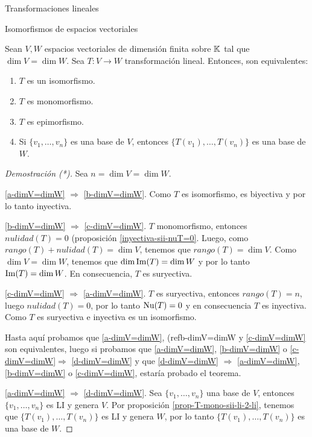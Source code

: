\begin{chapter}{Transformaciones lineales}
\begin{section}{Isomorfismos de espacios vectoriales}
        
   
            
            
        \begin{teorema}
            Sean $V,W$ espacios vectoriales de dimensión  finita sobre $\mathbb K$ tal que $\dim V = \dim W$. Sea $T: V \to W$ transformación lineal. Entonces,  son equivalentes:
            \begin{enumerate}[label=\textit{\alph*)},ref=\textit{\alph*)}]
                \item\label{a-dimV=dimW} $T$ es un  isomorfismo.
                \item\label{b-dimV=dimW} $T$ es monomorfismo.
                \item\label{c-dimV=dimW} $T$ es epimorfismo.
                \item\label{d-dimV=dimW} Si $\{v_1,\ldots,v_n \}$ es una base de $V$,  entonces $\{T(v_1),\ldots,T(v_n) \}$ es una base de $W$.
            \end{enumerate}
        \end{teorema}
        \begin{proof}[Demostración (*)] Sea $n = \dim V = \dim W$.
            
            
            \ref{a-dimV=dimW} $\Rightarrow$ \ref{b-dimV=dimW}. Como $T$ es isomorfismo,  es biyectiva y por lo tanto inyectiva.
            
            \ref{b-dimV=dimW} $\Rightarrow$ 
            \ref{c-dimV=dimW}. $T$ monomorfismo,  entonces $nulidad(T) = 0$ (proposición \ref{inyectiva-sii-nuT=0}. Luego, como  $rango(T) +nulidad(T) = \dim V$,  tenemos que $rango(T) = \dim V$. Como $\dim V = \dim W$, tenemos que $\dim \operatorname{Im}(T) = \dim W$ y por lo tanto $\operatorname{Im}(T) = \dim W$. En  consecuencia, $T$ es suryectiva.
            
            \ref{c-dimV=dimW} $\Rightarrow$ \ref{a-dimV=dimW}. $T$ es suryectiva, entonces $rango(T) = n$, luego  $nulidad(T) = 0$, por lo tanto $\operatorname{Nu}(T)=0$ y en consecuencia $T$ es inyectiva. Como $T$ es suryectiva e inyectiva  es un isomorfismo. 
            
            Hasta aquí probamos que \ref{a-dimV=dimW}, (ref{b-dimV=dimW} y \ref{c-dimV=dimW} son equivalentes, luego si probamos que \ref{a-dimV=dimW}, \ref{b-dimV=dimW} o \ref{c-dimV=dimW}$\Rightarrow$ \ref{d-dimV=dimW} y que \ref{d-dimV=dimW} $\Rightarrow$ \ref{a-dimV=dimW}, \ref{b-dimV=dimW} o \ref{c-dimV=dimW}, estaría probado el teorema. 
            
            \ref{a-dimV=dimW} $\Rightarrow$ \ref{d-dimV=dimW}. Sea $\{v_1,\ldots,v_n \}$  una base de $V$,  entonces $\{v_1,\ldots,v_n \}$ es LI y  genera $V$. Por proposición \ref{prop-T-mono-sii-li-2-li}, tenemos que $\{T(v_1),\ldots,T(v_n) \}$ es LI y  genera $W$, por lo tanto $\{T(v_1),\ldots,T(v_n) \}$ es una base de $W$.
            

\end{proof}
\end{section}
\end{chapter}
